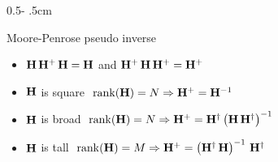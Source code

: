 \documentclass[a4paper]{cookbook}
\begin{document}
\begin{frame}
\begin{columns}[onlytextwidth]
\begin{column}{0.5\textwidth - .5cm}
\begin{block}{Moore-Penrose pseudo inverse}
   \begin{itemize}
       \item        $\mathbf{H}\,\mathbf{H}^+\,\mathbf{H} = \mathbf{H} $ and   $ \mathbf{H}^+\,\mathbf{H}\,\mathbf{H}^+ = \mathbf{H}^+ $
         \item   $\mathbf{H}$ is square  $\ \rank(\M{H}) = N \Rightarrow \M{H}^+ = \M{H}^{-1}$
        \item     $\mathbf{H}$ is broad $\ \rank(\M{H}) = N \Rightarrow \M{H}^+ = \M{H}\T \left(\M{H}\,\M{H}\T\right)^{-1}$
           \item $\mathbf{H}$ is  tall $\ \rank(\M{H}) = M \Rightarrow \M{H}^+ = \left(\M{H}\T\,\M{H}\right)^{-1}\,\M{H}\T $ 
   \end{itemize}
    \end{block}

\end{column}


\end{columns}

\end{frame}
\end{document}
